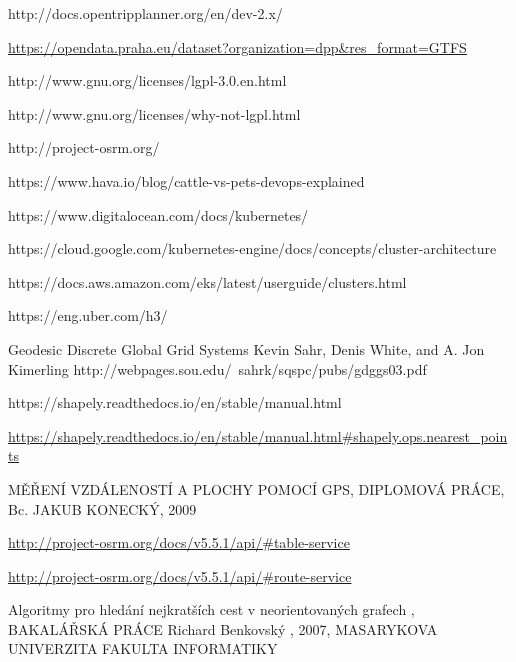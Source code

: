 \documentclass[thesis=M,czech]{FITthesis}[2019/12/23]
\theoremstyle{plain}
\theoremstyle{definition}
\begin{document}
\begin{thebibliography}{9}


http://docs.opentripplanner.org/en/dev-2.x/




\url{https://opendata.praha.eu/dataset?organization=dpp&res_format=GTFS}



http://www.gnu.org/licenses/lgpl-3.0.en.html



http://www.gnu.org/licenses/why-not-lgpl.html


http://project-osrm.org/


https://www.hava.io/blog/cattle-vs-pets-devops-explained



https://www.digitalocean.com/docs/kubernetes/


https://cloud.google.com/kubernetes-engine/docs/concepts/cluster-architecture


https://docs.aws.amazon.com/eks/latest/userguide/clusters.html



https://eng.uber.com/h3/



Geodesic Discrete Global Grid Systems
Kevin Sahr, Denis White, and A. Jon Kimerling
http://webpages.sou.edu/~sahrk/sqspc/pubs/gdggs03.pdf


https://shapely.readthedocs.io/en/stable/manual.html




\url{https://shapely.readthedocs.io/en/stable/manual.html#shapely.ops.nearest_points}


MĚŘENÍ VZDÁLENOSTÍ A PLOCHY POMOCÍ GPS, DIPLOMOVÁ PRÁCE,  Bc. JAKUB KONECKÝ, 2009



\url{http://project-osrm.org/docs/v5.5.1/api/#table-service}


\url{http://project-osrm.org/docs/v5.5.1/api/#route-service}



Algoritmy pro hledání nejkratších cest
v neorientovaných grafech , BAKALÁŘSKÁ PRÁCE
Richard Benkovský , 2007, MASARYKOVA UNIVERZITA
FAKULTA INFORMATIKY 


\end{thebibliography}
\end{document}
